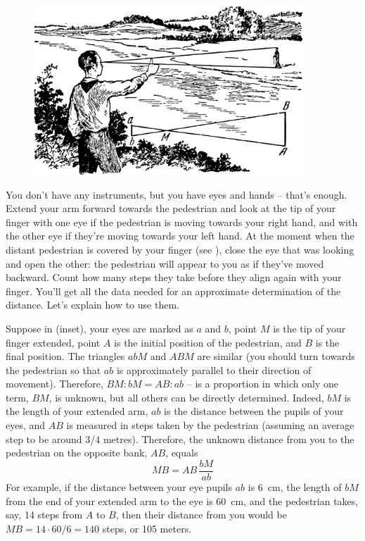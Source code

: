 \begin{figure}[h!]
\centering
\includegraphics[width=0.9\textwidth]{figures/ch-02/fig-036.pdf}
\end{figure}


\ans You don't have any instruments, but you have eyes and hands -- that's enough. Extend your arm forward towards the pedestrian and look at the tip of your finger with one eye if the pedestrian is moving towards your right hand, and with the other eye if they're moving towards your left hand. At the moment when the distant pedestrian is covered by your finger (see ), close the eye that was looking and open the other: the pedestrian will appear to you as if they've moved backward. Count how many steps they take before they align again with your finger. You'll get all the data needed for an approximate determination of the distance. Let's explain how to use them.

Suppose in  (inset), your eyes are marked as $a$ and $b$, point $M$ is the tip of your finger extended, point $A$ is the initial position of the pedestrian, and $B$ is the final position. The triangles $abM$ and $ABM$ are similar (you should turn towards the pedestrian so that $ab$ is approximately parallel to their direction of movement). Therefore, $BM : bM = AB : ab$ -- is a proportion in which only one term, $BM$, is unknown, but all others can be directly determined. Indeed, $bM$ is the length of your extended arm, $ab$ is the distance between the pupils of your eyes, and $AB$ is measured in steps taken by the pedestrian (assuming an average step to be around 3/4 metres). Therefore, the unknown distance from you to the pedestrian on the opposite bank, $AB$, equals 
\begin{equation*}%
MB = AB \, \frac{bM}{ab}
\end{equation*}
For example, if the distance between your eye pupils $ab$ is \SI{6}{\centi\meter}, the length of $bM$ from the end of your extended arm to the eye is \SI{60}{\centi\meter}, and the pedestrian takes, say, 14 steps from $A$ to $B$, then their distance from you would be $MB = 14 \cdot 60/6 = 140$ steps, or 105 meters.

